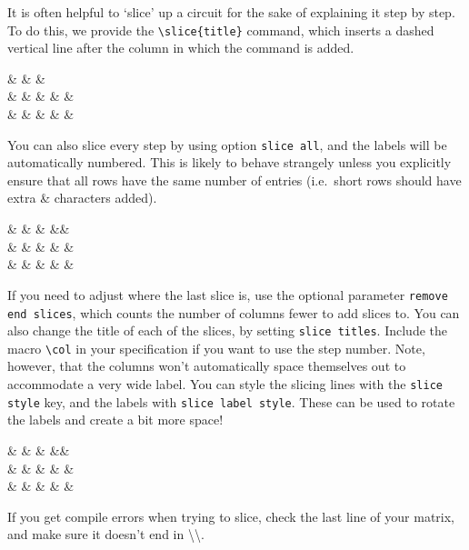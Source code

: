 \documentclass[aps,pra,10pt,nofootinbib]{revtex4-2}
\begin{document}
It is often helpful to `slice' up a circuit for the sake of explaining it step by step. To do this, we provide the \verb!\slice{title}! command, which inserts a dashed vertical line after the column in which the command is added.
\begin{Code}
\begin{quantikz}
&   &  & \meter{} \\
&       & \targ{} &  &  & \\
& & & \targ{} & &
\end{quantikz}
\end{Code}
You can also slice every step by using option \verb!slice all!, and the labels will be automatically numbered. This is likely to behave strangely unless you explicitly ensure that all rows have the same number of entries (i.e.\ short rows should have extra \& characters added).
\begin{Code}
\begin{quantikz}
&  &  & \meter{} && \\
&       & \targ{} &  &  & \\
& & & \targ{} & &
\end{quantikz}
\end{Code}
If you need to adjust where the last slice is, use the optional parameter \verb!remove end slices!, which counts the number of columns fewer to add slices to. You can also change the title of each of the slices, by setting \verb!slice titles!. Include the macro \verb!\col! in your specification if you want to use the step number. Note, however, that the columns won't automatically space themselves out to accommodate a very wide label. You can style the slicing lines with the \verb!slice style! key, and the labels with \verb!slice label style!. These can be used to rotate the labels and create a bit more space!
\begin{Code}
\begin{quantikz}[slice all,remove end slices=1,slice titles=slice \col,slice style=blue,slice label style={inner sep=1pt,anchor=south west,rotate=40}]
&  &  & \meter{} && \\
&       & \targ{} &  &  & \\
& & & \targ{} & &
\end{quantikz}
\end{Code}
\noindent If you get compile errors when trying to slice, check the last line of your matrix, and make sure it doesn't end in \textbackslash\textbackslash.
\end{document}
